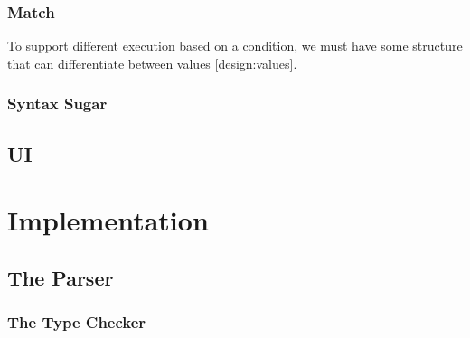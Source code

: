 \subsubsection{Match}
To support different execution based on a condition, we must have some structure that can differentiate between values \ref{design:values}. 

\subsubsection{Syntax Sugar}

\subsection{UI}


\section{Implementation}
\subsection{The Parser}

\subsubsection{The Type Checker}
